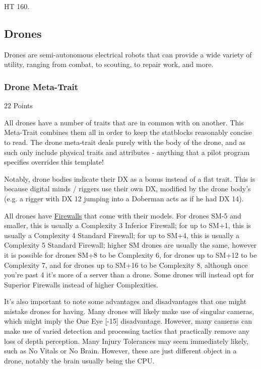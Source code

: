 HT 160.

\subsection{Drones}\label{drones}

Drones are semi-autonomous electrical robots that can provide a wide variety of utility, ranging from combat, to scouting, to repair work, and more.

\subsubsection{Drone Meta-Trait}
\begin{flushright}
	22 Points
\end{flushright}

All drones have a number of traits that are in common with on another. This Meta-Trait combines them all in order to keep the statblocks reasonably concise to read. The drone meta-trait deals purely with the body of the drone, and as such only include physical traits and attributes - anything that a pilot program specifies overrides this template!

Notably, drone bodies indicate their DX as a bonus instead of a flat trait. This is because digital minds / riggers use their own DX, modified by the drone body's (e.g. a rigger with DX 12 jumping into a Doberman acts as if he had DX 14).

All drones have \hyperref[firewall]{Firewalls} that come with their models. For drones SM-5 and smaller, this is usually a Complexity 3 Inferior Firewall; for up to SM+1, this is usually a Complexity 4 Standard Firewall; for up to SM+4, this is usually a Complexity 5 Standard Firewall; higher SM drones are usually the same, however it is possible for drones SM+8 to be Complexity 6, for drones up to SM+12 to be Complexity 7, and for drones up to SM+16 to be Complexity 8, although once you're past 4 it's more of a server than a drone. Some drones will instead opt for Superior Firewalls instead of higher Complexities.

It's also important to note some advantages and disadvantages that one might mistake drones for having. Many drones will likely make use of singular cameras, which might imply the One Eye [-15] disadvantage. However, many cameras can make use of varied detection and processing tactics that practically remove any loss of depth perception. Many Injury Tolerances may seem immediately likely, such as No Vitals or No Brain. However, these are just different object in a drone, notably the brain usually being the CPU.

